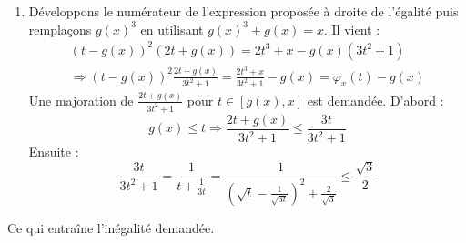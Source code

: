 \begin{enumerate}
\begin{enumerate}
 \item Développons le numérateur de l'expression proposée à droite de l'égalité puis remplaçons $g(x)^3$ en utilisant $g(x)^3+g(x)=x$. Il vient :
\begin{multline*}
 (t-g(x))^2(2t+g(x))=
2t^3+x-g(x)(3t^2+1)\\
\Rightarrow
(t-g(x))^2\frac{2t+g(x)}{3t^2+1}=\frac{2t^3+x}{3t^2+1}-g(x)=\varphi_x(t)-g(x)
\end{multline*}
Une majoration de $\frac{2t+g(x)}{3t^2+1}$ pour $t\in [g(x),x]$ est demandée. D'abord :
\begin{displaymath}
 g(x)\leq t \Rightarrow \frac{2t+g(x)}{3t^2+1}\leq \frac{3t}{3t^2+1}
\end{displaymath}
Ensuite :
\begin{displaymath}
 \frac{3t}{3t^2+1}=\frac{1}{t+\frac{1}{3t}}
=\frac{1}{\left( \sqrt{t}-\frac{1}{\sqrt{3t}}\right)^2+\frac{2}{\sqrt{3} }}
\leq \frac{\sqrt{3}}{2}
\end{displaymath}
\end{enumerate}
Ce qui entraîne l'inégalité demandée.
\end{enumerate}
